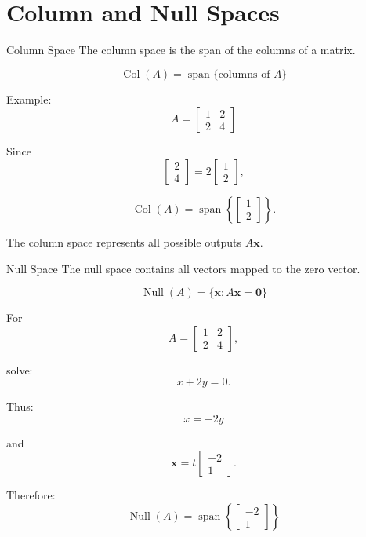 \documentclass[aspectratio=169]{beamer}
\begin{document}
\section{Column and Null Spaces}

\begin{frame}{Column Space}
The column space is the span of the columns of a matrix.

\[
\operatorname{Col}(A)
=
\operatorname{span}\{\text{columns of }A\}
\]

Example:
\[
A=
\begin{bmatrix}
1&2\\
2&4
\end{bmatrix}
\]

Since
\[
\begin{bmatrix}2\\4\end{bmatrix}
=
2\begin{bmatrix}1\\2\end{bmatrix},
\]

\[
\operatorname{Col}(A)
=
\operatorname{span}
\left\{
\begin{bmatrix}1\\2\end{bmatrix}
\right\}.
\]

The column space represents all possible outputs $A\mathbf x$.
\end{frame}

\begin{frame}{Null Space}
The null space contains all vectors mapped to the zero vector.

\[
\boxed{
\operatorname{Null}(A)=
\{\mathbf x:A\mathbf x=\mathbf0\}
}
\]

For
\[
A=
\begin{bmatrix}
1&2\\
2&4
\end{bmatrix},
\]

solve:
\[
x+2y=0.
\]

Thus:
\[
x=-2y
\]

and
\[
\mathbf x
=
t\begin{bmatrix}-2\\1\end{bmatrix}.
\]

Therefore:
\[
\boxed{
\operatorname{Null}(A)=
\operatorname{span}
\left\{
\begin{bmatrix}-2\\1\end{bmatrix}
\right\}
}
\]
\end{frame}
\end{document}
